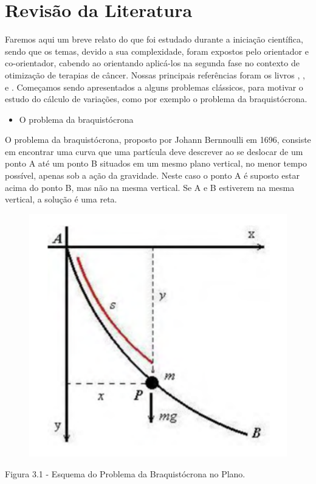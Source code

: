 \documentclass[12pt, a4paper]{article}
\begin{document}
\newpage

\section{Revisão da Literatura}

Faremos aqui um breve relato do que foi estudado durante a iniciação científica, sendo que os temas, devido a sua complexidade, foram expostos pelo orientador e  co-orientador, cabendo ao orientando aplicá-los na segunda fase no contexto de otimização de terapias de câncer. Nossas principais referências foram os livros \cite{Burns2014}, \cite{Kot2014}, \cite{Liberzon2012} e \cite{Schaettler2014}.
Começamos sendo apresentados a alguns problemas clássicos, para motivar o estudo do cálculo de variações, como por exemplo o problema da braquistócrona.

\begin{itemize}
\item O problema da braquistócrona
\end{itemize}

O problema da braquistócrona, proposto por Johann Bernnoulli em 1696, consiste em encontrar uma curva que uma partícula deve descrever ao se deslocar de um ponto A até um ponto B situados em um mesmo plano vertical, no menor tempo possível, apenas sob a ação da gravidade. Neste caso o ponto A é suposto estar acima do ponto B, mas não na mesma vertical. Se A e B estiverem na mesma vertical, a solução é uma reta.


\begin{center}
\begin{figure}[!h]
	\centering
    \includegraphics[scale=0.6]{imgs/braquistocrona.png}

  \end{figure}

Figura 3.1 - Esquema do Problema da Braquistócrona no Plano.

\end{center}
\end{document}
